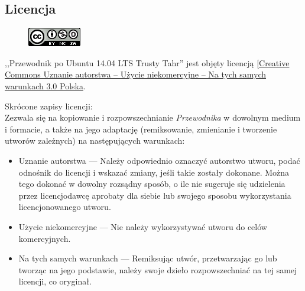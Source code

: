 \subsection{Licencja}
\begin{figure}
	\vspace{-10pt}
	\includegraphics[width=\linewidth]{images/CC.png}
\end{figure}

,,Przewodnik po Ubuntu 14.04 LTS Trusty Tahr'' jest objęty licencją [\href{http://creativecommons.org/licenses/by-nc-sa/3.0/pl/}{Creative Commons Uznanie autorstwa -- Użycie niekomercyjne -- Na tych samych warunkach 3.0 Polska}.

Skrócone zapisy licencji:\\
Zezwala się na kopiowanie i rozpowszechnianie \textit{Przewodnika} w dowolnym medium i formacie, a także na jego adaptację (remiksowanie, zmienianie i tworzenie utworów zależnych) na następujących warunkach:
\begin{itemize}
\item Uznanie autorstwa --- Należy odpowiednio oznaczyć autorstwo utworu, podać odnośnik do licencji i wskazać zmiany, jeśli takie zostały dokonane. Można tego dokonać w dowolny rozsądny sposób, o ile nie sugeruje się udzielenia przez licencjodawcę aprobaty dla siebie lub swojego sposobu wykorzystania licencjonowanego utworu.
\item Użycie niekomercyjne --- Nie należy wykorzystywać utworu do celów komercyjnych.
\item Na tych samych warunkach --- Remiksując utwór, przetwarzając go lub tworząc na jego podstawie, należy swoje dzieło rozpowszechniać na tej samej licencji, co oryginał. 
\end{itemize}
\clearpage
